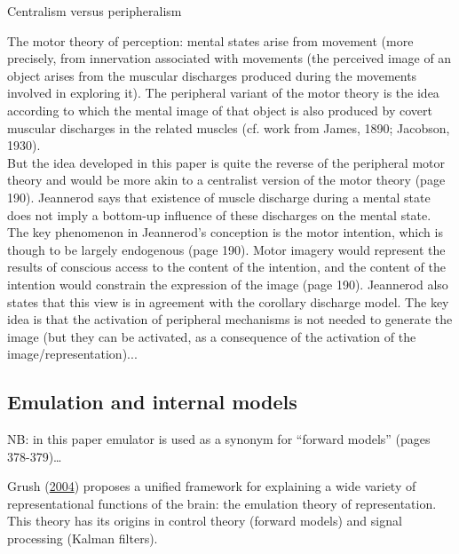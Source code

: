 \documentclass[a4paper,12pt,twoside,openright,oldfontcommands]{memoir}
\begin{document}
\vspace{2mm}

\begin{mybox}[label = centralism]{Centralism versus peripheralism}

The motor theory of perception: mental states arise from movement (more precisely, from innervation associated with movements (the perceived image of an object arises from the muscular discharges produced during the movements involved in exploring it). The peripheral variant of the motor theory is the idea according to which the mental image of that object is also produced by covert muscular discharges in the related muscles (cf. work from James, 1890; Jacobson, 1930).\\

But the idea developed in this paper is quite the reverse of the peripheral motor theory and would be more akin to a centralist version of the motor theory (page 190). Jeannerod says that existence of muscle discharge during a mental state does not imply a bottom-up influence of these discharges on the mental state. The key phenomenon in Jeannerod’s conception is the motor intention, which is though to be largely endogenous (page 190). Motor imagery would represent the results of conscious access to the content of the intention, and the content of the intention would constrain the expression of the image (page 190). Jeannerod also states that this view is in agreement with the corollary discharge model. The key idea is that the activation of peripheral mechanisms is not needed to generate the image (but they can be activated, as a consequence of the activation of the image/representation)...

\end{mybox}

\subsection{Emulation and internal
models}\label{emulation-and-internal-models}

NB: in this paper emulator is used as a synonym for ``forward models''
(pages 378-379)\ldots{}

Grush (\protect\hyperlink{ref-grush_emulation_2004}{2004}) proposes a
unified framework for explaining a wide variety of representational
functions of the brain: the emulation theory of representation. This
theory has its origins in control theory (forward models) and signal
processing (Kalman filters).
\end{document}
